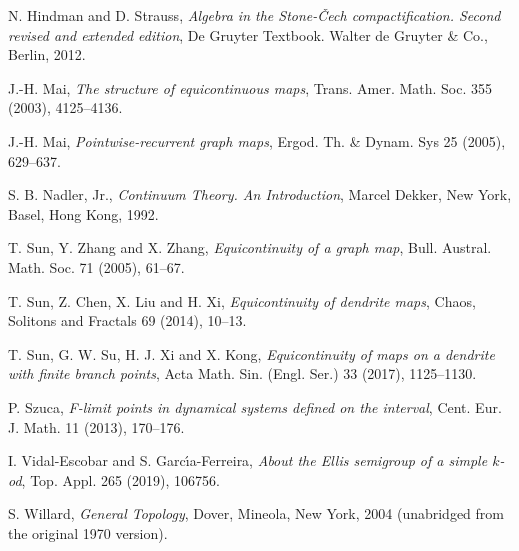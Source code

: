 \documentclass[12pt]{amsart}
\theoremstyle{definition}
\numberwithin{equation}{section}
\begin{document}
\begin{thebibliography}{[HD82]}
N. Hindman and D. Strauss,
\emph{Algebra in the {S}tone-\v {C}ech compactification. Second revised and extended edition},
De Gruyter Textbook. Walter de Gruyter \& Co., Berlin, 2012.

J.-H. Mai,
\emph{The structure of equicontinuous maps},
Trans. Amer. Math. Soc.
355 (2003), 4125--4136.

J.-H. Mai,
\emph{Pointwise-recurrent graph maps},
Ergod. Th. \& Dynam. Sys
25 (2005), 629--637.

S. B. Nadler, Jr.,
\emph{Continuum Theory. An Introduction},
Marcel Dekker, New York, Basel, Hong Kong, 1992.


T. Sun, Y. Zhang and X. Zhang, 
\emph{Equicontinuity of a graph map},
Bull. Austral. Math. Soc.
71 (2005), 61--67.

T. Sun, Z. Chen, X. Liu and H. Xi,
\emph{Equicontinuity of dendrite maps},
Chaos, Solitons and Fractals
69 (2014), 10--13.

T. Sun, G. W. Su, H. J. Xi and X. Kong,
\emph{Equicontinuity of maps on a dendrite with finite branch points},
Acta Math. Sin. (Engl. Ser.)
33 (2017), 1125--1130.

P. Szuca,
\emph{F-limit points in dynamical systems defined on the interval},
Cent. Eur. J. Math.
11 (2013), 170--176.

I. Vidal-Escobar and S. Garc\'{\i}a-Ferreira,
\emph{About the Ellis semigroup of a simple $k$-od},
Top. Appl.
265 (2019), 106756.

S. Willard,
\emph{General Topology},
Dover, Mineola, New York, 2004 (unabridged from the original 1970 version).

\end{thebibliography}
\end{document}
